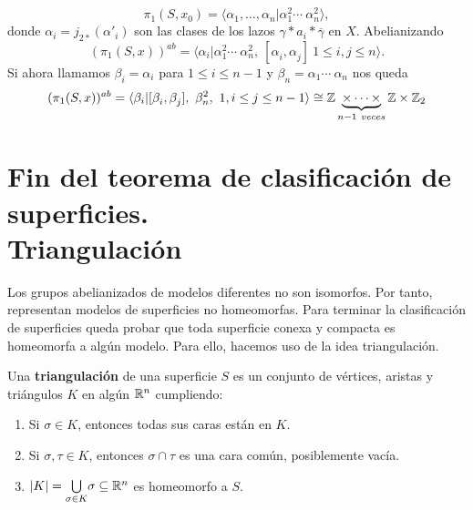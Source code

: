 \documentclass[GTSResumen.tex]{subfiles}
\begin{document}
\[
\pi_1(S,x_0)=\langle\alpha_1,\dots,\alpha_n|\alpha_1^2\cdots\ \alpha_n^2\rangle,
\]
donde $\alpha_i=j_{2*}(\alpha'_i)$ son las clases de los lazos $\gamma*a_i*\overline{\gamma}$ en $X$. Abelianizando
\[
(\pi_1(S,x))^{ab}=\langle\alpha_i|\alpha_1^2\cdots\ \alpha_n^2,\ [\alpha^{}_i,\alpha^{}_j]\ 1\leq i, j\leq n \rangle.
\]
Si ahora llamamos $\beta_i=\alpha_i$ para $1\leq i\leq n-1$ y $\beta_n=\alpha_1\cdots\ \alpha_n$ nos queda
\[
(\pi_1(S,x))^{ab}=\langle\beta_i|[\beta^{}_i,\beta^{}_j],\ \beta^2_n,\ 1, i\leq j\leq n-1\rangle\cong\Z\underbrace{\times\cdots\times}_{n-1\ veces}\Z\times\Z_2
\]
\section{Fin del teorema de clasificación de superficies.\\ Triangulación}
Los grupos abelianizados de modelos diferentes no son isomorfos. Por tanto, representan modelos de superficies no homeomorfas. Para terminar la clasificación de superficies queda probar que toda superficie conexa y compacta es homeomorfa a algún modelo. Para ello, hacemos uso de la idea triangulación.

\begin{defi}
Una \textbf{triangulación} de una superficie $S$ es un conjunto de vértices, aristas y triángulos $K$  en algún $\mathbb{R}^n$ cumpliendo:
\begin{enumerate}
\item Si $\sigma\in K$, entonces todas sus caras están en $K$.
\item Si $\sigma,\tau\in K$, entonces $\sigma\cap\tau$ es una cara común, posiblemente vacía.
\item $|K|=\underset{\sigma\in K}{\bigcup}\sigma\subseteq\mathbb{R}^n$ es homeomorfo a $S$.
\end{enumerate}
\end{defi}
\end{document}
